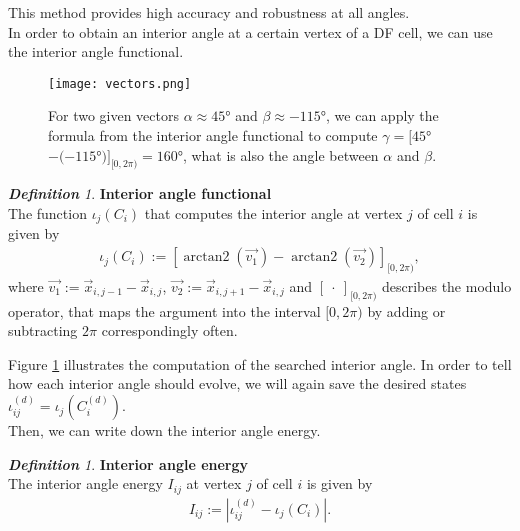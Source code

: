 \documentclass[a4paper,12pt,leqno]{article}
\theoremstyle{plain}
\theoremstyle{remark}
\newtheorem{definition}[theorem]{\bf Definition}
\DeclareMathOperator{\atanxy}{arctan2}
\begin{document}
This method provides high accuracy and robustness at all angles.\\
In order to obtain an interior angle at a certain vertex of a DF cell, we can use the interior angle functional.	\\
\begin{figure}[b!]
	\begin{center}
		\texttt{[image: vectors.png]}
		\caption{For two given vectors $\alpha \approx 45$° and $\beta \approx -115$°, we can apply the formula from the interior angle functional to compute $\gamma = [ 45$°$ - (-115$°$)]_{[0, 2\pi)} = 160$°, what is also the angle between $\alpha$ and $\beta$.}
		\label{fig:vectors}
	\end{center}
\end{figure}
\begin{definition} \textbf{Interior angle functional} \\
	The function $\iota_j(C_i)$ that computes the interior angle at vertex $j$ of cell $i$ is given by 
	\begin{align}
		\iota_j(C_i) := [\atanxy(\vec{v_1}) - \atanxy(\vec{v_2})]_{[0, 2\pi)},
	\end{align}
	where $\vec{v_1} := \vec{x}_{i,j-1} - \vec{x}_{i,j}$,  $\vec{v_2} := \vec{x}_{i,j+1} - \vec{x}_{i,j}$ and $[\: \cdot \: ]_{[0, 2\pi)}$ describes the modulo operator, that maps the argument into the interval $[0, 2\pi)$ by adding or subtracting $2\pi$ correspondingly often. \\
\end{definition}
Figure \ref{fig:vectors} illustrates the computation of the searched interior angle.	
In order to tell how each interior angle should evolve, we will again save the desired states $\iota_{ij}^{(d)} = \iota_j(C^{(d)}_i)$. \\
Then, we can write down the interior angle energy. \\
\begin{definition} \textbf{Interior angle energy} \\
	The interior angle energy $I_{ij}$ at vertex $j$ of cell $i$ is given by 
	\begin{align}
		I_{ij} := |\iota_{ij}^{(d)} - \iota_j(C_i)|.
	\end{align}
\end{definition}
\end{document}
